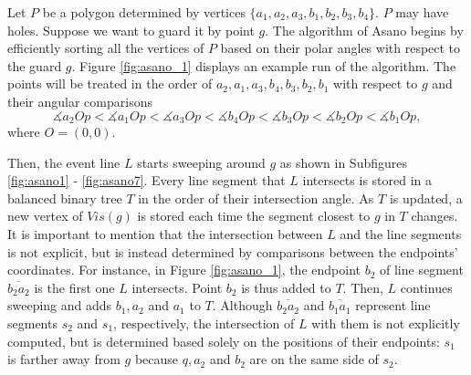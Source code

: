 Let $P$ be a polygon determined by vertices $\{a_1, a_2, a_3, b_1, b_2, b_3, b_4\}$. $P$ may have holes. Suppose we want to guard it by point $g$. The algorithm of Asano \cite{asano1985efficient} begins by efficiently sorting all the vertices of $P$ based on their polar angles with respect to the guard $g$. Figure \ref{fig:asano_1} displays an example run of the algorithm. The points will be treated in the order of $a_2, a_1, a_3, b_4, b_3, b_2, b_1$ with respect to $g$ and their angular comparisons $$\measuredangle a_2Op < \measuredangle a_1Op < \measuredangle a_3Op < \measuredangle b_4Op < \measuredangle b_3Op < \measuredangle b_2Op < \measuredangle b_1Op,$$ where $O = (0, 0)$.


Then, the event line $L$ starts sweeping around $g$ as shown in Subfigures \ref{fig:asano1} - \ref{fig:asano7}. Every line segment that $L$ intersects is stored in a balanced binary tree $T$ in the order of their intersection angle. As $T$ is updated, a new vertex of $\mathit{Vis}(g)$ is stored each time the segment closest to $g$ in $T$ changes. It is important to mention that the intersection between $L$ and the line segments is not explicit, but is instead determined by comparisons between the endpoints' coordinates. For instance, in Figure \ref{fig:asano_1}, the endpoint $b_2$ of line segment $\overline{b_2a_2}$ is the first one $L$ intersects. Point $b_2$ is thus added to $T$. Then, $L$ continues sweeping and adds $b_1, a_2$ and $a_1$ to $T$. Although $\overline{b_2a_2}$ and $\overline{b_1a_1}$ represent line segments $s_2$ and $s_1$, respectively, the intersection of $L$ with them is not explicitly computed, but is determined based solely on the positions of their endpoints: $s_1$ is farther away from $g$ because $q, a_2$ and $b_2$ are on the same side of $s_2$.

